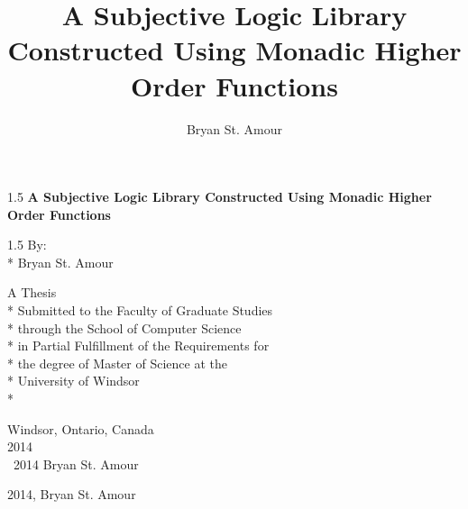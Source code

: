 \documentclass[oneside, 12pt]{book}
\title{A Subjective Logic Library Constructed Using Monadic Higher Order Functions}
\author{Bryan St. Amour}
\newcommand{\uwinonehalfspacelen}{1.5}
\newenvironment{uwinonehalfspaceenv}%
{\begin{spacing}{\uwinonehalfspacelen}}%
  {\end{spacing}}
\begin{document}



\clearpage


\thispagestyle{empty}
\begin{center}
  \vspace*{1in}

  \begin{uwinonehalfspaceenv}
    \Large\textbf{A Subjective Logic Library Constructed Using Monadic Higher Order Functions}
  \end{uwinonehalfspaceenv}

  \vspace{\fill} %
  \begin{uwinonehalfspaceenv}
    By:\\*
    Bryan St. Amour
  \end{uwinonehalfspaceenv}
  \vspace{\fill}

  \normalsize
  A Thesis \\*
  Submitted to the Faculty of Graduate Studies \\*
  through the School of Computer Science \\*
  in Partial Fulfillment of the Requirements for \\*
  the degree of Master of Science at the \\*
  University of Windsor \\*

  \vspace{1in}
  Windsor, Ontario, Canada \\
  \vspace{0.5cm}
  2014 \\
  \vspace{0.5cm}
  \textcopyright \  2014 Bryan St. Amour
\end{center}


\clearpage
\thispagestyle{empty}

\vspace*{\fill}

\noindent \textcopyright{} 2014, Bryan St. Amour

\vspace{2ex}
\end{document}
